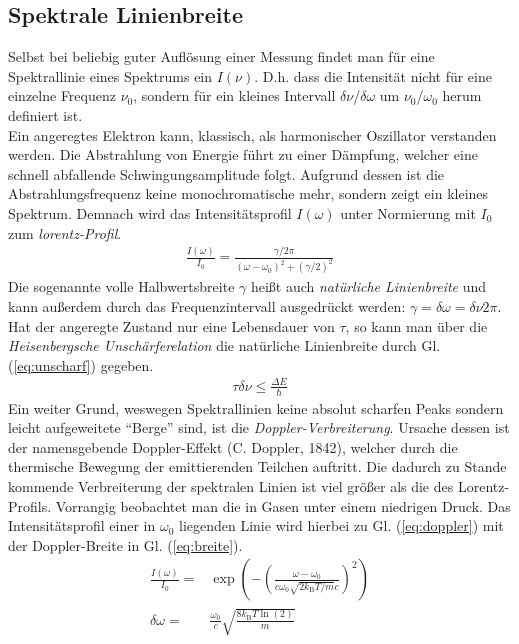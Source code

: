 \documentclass[numbers=noenddot,12pt,a4paper]{scrartcl}
\newcommand{\ix}[1]{_\text{#1}}
\newcommand{\tilt}[1]{\textit{#1}}
\begin{document}
\subsection{Spektrale Linienbreite}\label{subsec:breite}
Selbst bei beliebig guter Auflösung einer Messung findet man für eine Spektrallinie eines Spektrums ein $I(\nu)$. D.h. dass die Intensität nicht für eine einzelne Frequenz $\nu\ix{0}$, sondern für ein kleines Intervall $\delta\nu$/$\delta\omega$ um $\nu\ix{0}$/$\omega\ix{0}$ herum definiert ist.\\
Ein angeregtes Elektron kann, klassisch, als harmonischer Oszillator verstanden werden. Die Abstrahlung von Energie führt zu einer Dämpfung, welcher eine schnell abfallende Schwingungsamplitude folgt. Aufgrund dessen ist die Abstrahlungsfrequenz keine monochromatische mehr, sondern zeigt ein kleines Spektrum. Demnach wird das Intensitätsprofil $I(\omega)$ unter Normierung mit $I\ix{0}$ zum \tilt{lorentz-Profil}.
\begin{align}
	\frac{I(\omega)}{I\ix{0}}=\frac{\gamma/2\pi}{\left(\omega-\omega\ix{0}\right)^2+\left(\gamma/2\right)^2}
\end{align}
Die sogenannte volle Halbwertsbreite $\gamma$ heißt auch \tilt{natürliche Linienbreite} und kann außerdem durch das Frequenzintervall ausgedrückt werden: $\gamma=\delta\omega=\delta\nu 2\pi$.\\
Hat der angeregte Zustand nur eine Lebensdauer von $\tau$, so kann man über die \tilt{Heisenbergsche Unschärferelation} die natürliche Linienbreite durch Gl. (\ref{eq:unscharf}) gegeben.
\begin{align}
	\tau \delta\nu \leq\frac{\Delta E}{\hbar} \label{eq:unscharf}
\end{align}
Ein weiter Grund, weswegen Spektrallinien keine absolut scharfen Peaks sondern leicht aufgeweitete "`Berge"' sind, ist die \tilt{Doppler-Verbreiterung}. Ursache dessen ist der namensgebende Doppler-Effekt (C. Doppler, 1842), welcher durch die thermische Bewegung der emittierenden Teilchen auftritt. Die dadurch zu Stande kommende Verbreiterung der spektralen Linien ist viel größer als die des Lorentz-Profils. Vorrangig beobachtet man die in Gasen unter einem niedrigen Druck. Das Intensitätsprofil einer in $\omega\ix{0}$ liegenden Linie wird hierbei zu Gl. (\ref{eq:doppler}) mit der Doppler-Breite in Gl. (\ref{eq:breite}).
\begin{align}
	\frac{I(\omega)}{I\ix{0}}=&\exp\left({-\left(\frac{\omega-\omega\ix{0}}{c\omega\ix{0}\sqrt{2k\ix{B}T/m}c}\right)^2}\right)\label{eq:doppler}\\
	\delta\omega=&\frac{\omega\ix{0}}{c}\sqrt{\frac{8k\ix{B}T\ln\left(2\right)}{m}}\label{eq:breite}
\end{align}
\newpage
\end{document}
